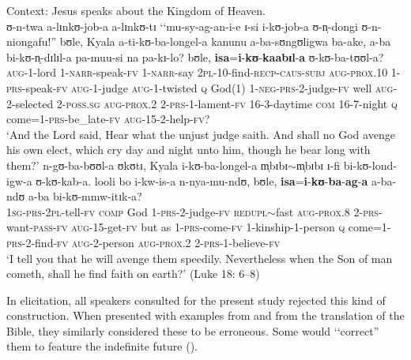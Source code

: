 \begin{exe}
\ex \label{exProcliticIsa2}
Context: Jesus speaks about the Kingdom of Heaven.\\
\gll ʊ-n-twa a-lɪnkʊ-job-a a-lɪnkʊ-tɪ \lq\lq mu-sy-ag-an-i-e ɪ-si i-kʊ-job-a ʊ-n̩-dongi ʊ-n-niongafu!'' bʊle, Kyala a-ti-kʊ-ba-longel-a kanunu a-ba-sʊngʊligwa ba-ake, a-ba bi-kʊ-n̩-dɪlɪl-a pa-muu-si na pa-kɪ-lo? bʊle, \textbf{isa}=\textbf{i}-\textbf{kʊ}-\textbf{kaabɪl}-\textbf{a} ʊ-kʊ-ba-tʊʊl-a?\\
\textsc{aug}-1-lord 1-\textsc{narr}-speak-\textsc{fv} 1-\textsc{narr}-say \phantom{\lq\lq}\textsc{2pl}-10-find-\textsc{recp}-\textsc{caus}-\textsc{subj} \textsc{aug}-\textsc{prox.10} 1-\textsc{prs}-speak-\textsc{fv} \textsc{aug}-1-judge \textsc{aug}-1-twisted \textsc{q} God(1) 1-\textsc{neg}-\textsc{prs}-2-judge-\textsc{fv} well \textsc{aug}-2-selected 2-\textsc{poss.sg} \textsc{aug}-\textsc{prox.2} 2-\textsc{prs}-1-lament-\textsc{fv} 16-3-daytime \textsc{com} 16-7-night \textsc{q} come=1-\textsc{prs}-be\_late-\textsc{fv} \textsc{aug}-15-2-help-\textsc{fv}?\\
\glt \lq And the Lord said, Hear what the unjust judge saith. And shall no God avenge his own elect, which cry day and night unto him, though he bear long with them?'
\sn \gll n-gʊ-ba-bʊʊl-a ʊkʊtɪ, Kyala i-kʊ-ba-longel-a m̩bɪbɪ$\sim$m̩bɪbɪ ɪ-fi bi-kʊ-lond-igw-a ʊ-kʊ-kab-a. looli bo i-kw-is-a n-nya-mu-ndʊ, bʊle, \textbf{isa}=\textbf{i}-\textbf{kʊ}-\textbf{ba}-\textbf{ag}-\textbf{a} a-ba-ndʊ a-ba bi-kʊ-mmw-itɪk-a?\\
\textsc{1sg}-\textsc{prs}-\textsc{2pl}-tell-\textsc{fv} \textsc{comp} God 1-\textsc{prs}-2-judge-\textsc{fv} \textsc{redupl}$\sim$fast \textsc{aug}-\textsc{prox.8} 2-\textsc{prs}-want-\textsc{pass}-\textsc{fv} \textsc{aug}-15-get-\textsc{fv} but as 1-\textsc{prs}-come-\textsc{fv} 1-kinship-1-person \textsc{q} come=1-\textsc{prs}-2-find-\textsc{fv} \textsc{aug}-2-person \textsc{aug}-\textsc{prox.2} 2-\textsc{prs}-1-believe-\textsc{fv}\\
\glt \lq  I tell you that he will avenge them speedily. Nevertheless when the Son of man cometh, shall he find faith on earth?' (Luke 18: 6--8)
\end{exe}

In elicitation, all speakers consulted for the present study rejected this kind of construction. When presented with examples from \citet{BergerP1933} and from the translation of the Bible, they similarly considered these to be erroneous. Some would \lq\lq correct'' them to feature the indefinite future ().

